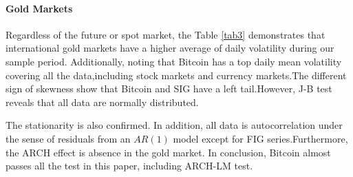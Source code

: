 \documentclass[review]{elsarticle}
\begin{document}
\paragraph{Gold Markets}
Regardless of the future or spot market, the Table \ref{tab3} demonstrates that international gold markets have a higher average of daily volatility during our sample period. Additionally, noting that Bitcoin has a top daily mean volatility covering all the data,including stock markets and currency markets.The different sign of skewness show that Bitcoin and SIG have a left tail.However, J-B test reveals that all data are normally distributed. 


The stationarity is also confirmed. In addition, all data is autocorrelation under the sense of residuals from an $AR(1)$ model except for FIG series.Furthermore, the ARCH effect is absence in the gold market. In conclusion, Bitcoin almost passes all the test in this paper, including ARCH-LM test.


\begin{table}[]
	\centering
	\setlength{\abovecaptionskip}{0pt}%
	\setlength{\belowcaptionskip}{10pt}%
	\caption{Summary statistics of daily volatility related to gold markets}
	\label{tab3}
\end{table}
\end{document}
